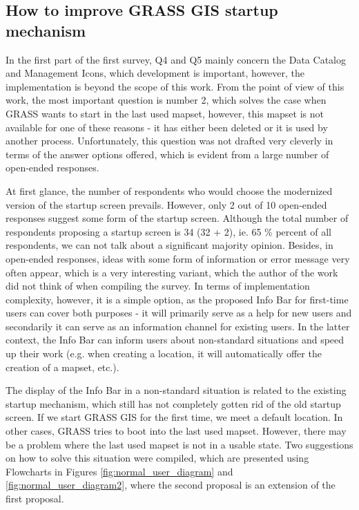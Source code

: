 \documentclass[a4paper,10pt,twoside]{article}
\begin{document}
\subsection{How to improve GRASS GIS startup mechanism}
\label{sec:proposal2}

In the first part of the first survey, Q4 and Q5 mainly concern the
Data Catalog and Management Icons, which development is important,
however, the implementation is beyond the scope of this work. From the
point of view of this work, the most important question is number 2,
which solves the case when GRASS wants to start in the last used
mapset, however, this mapset is not available for one of these reasons
- it has either been deleted or it is used by another
process. Unfortunately, this question was not drafted very cleverly in
terms of the answer options offered, which is evident from a large
number of open-ended responses.

At first glance, the number of respondents who would choose the
modernized version of the startup screen prevails. However, only 2 out
of 10 open-ended responses suggest some form of the startup
screen. Although the total number of respondents proposing a startup
screen is 34 (32 + 2), ie. 65 \% percent of all respondents, we can
not talk about a significant majority opinion. Besides, in open-ended
responses, ideas with some form of information or error message very
often appear, which is a very interesting variant, which the author of
the work did not think of when compiling the survey. In terms of
implementation complexity, however, it is a simple option, as the
proposed Info Bar for first-time users can cover both purposes - it
will primarily serve as a help for new users and secondarily it can
serve as an information channel for existing users. In the latter
context, the Info Bar can inform users about non-standard situations
and speed up their work (e.g. when creating a location, it will
automatically offer the creation of a mapset, etc.).

The display of the Info Bar in a non-standard situation is related to
the existing startup mechanism, which still has not completely gotten
rid of the old startup screen. If we start GRASS GIS for the first
time, we meet a default location. In other cases, GRASS tries to boot
into the last used mapset. However, there may be a problem where the
last used mapset is not in a usable state. Two suggestions on how to
solve this situation were compiled, which are presented using
Flowcharts in Figures \ref{fig:normal_user_diagram} and
\ref{fig:normal_user_diagram2}, where the second proposal is an
extension of the first proposal.
\end{document}
